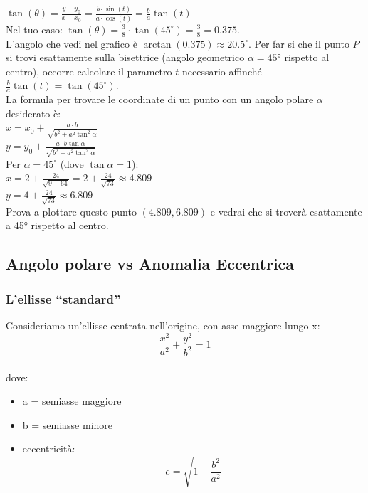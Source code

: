 \documentclass[a4paper,14pt]{article}
\begin{document}
\(\tan (\theta )=\frac{y-y_{0}}{x-x_{0}}=\frac{b\cdot \sin (t)}{a\cdot \cos (t)}=\frac{b}{a}\tan (t)\)\\
Nel tuo caso: \(\tan (\theta )=\frac{3}{8}\cdot \tan (45^{\circ } )=\frac{3}{8}=0.375\).\\
L'angolo che vedi nel grafico è \(\arctan (0.375)\approx \mathbf{20.5^{\circ } }\).
Per far si che il punto \(P\) si trovi esattamente sulla bisettrice (angolo geometrico \( \alpha =45\)° rispetto al centro), occorre calcolare il parametro \(t\) necessario affinché \(\frac{b}{a}\tan (t)=\tan (45^{\circ } )\).\\
La formula per trovare le coordinate di un punto con un angolo polare \(\alpha \) desiderato è:\\
\(x=x_{0}+\frac{a\cdot b}{\sqrt{b^{2}+a^{2}\tan ^{2}\alpha }}\)\\
\(y=y_{0}+\frac{a\cdot b\tan \alpha }{\sqrt{b^{2}+a^{2}\tan ^{2}\alpha }}\)\\
Per \(\alpha =45^{\circ } \) (dove \(\tan \alpha =1\)):\\
\(x=2+\frac{24}{\sqrt{9+64}}=2+\frac{24}{\sqrt{73}}\approx \mathbf{4.809}\)\\
\(y=4+\frac{24}{\sqrt{73}}\approx \mathbf{6.809}\)\\
Prova a plottare questo punto \((4.809,6.809)\) e vedrai che si troverà esattamente a 45° rispetto al centro.
\subsection{Angolo polare vs Anomalia Eccentrica}
\subsubsection{ L’ellisse “standard”}
Consideriamo un’ellisse centrata nell’origine, con asse maggiore lungo x:
\[
\frac{x^2}{a^2}+\frac{y^2}{b^2}=1
\]\\
dove:\\
\begin{itemize}
\item a = semiasse maggiore\\
\item b = semiasse minore\\
\item eccentricità:\\
\[e=\sqrt{1-\frac{b^{2}}{a^{2}}}\]\\​
\end{itemize}
\end{document}
